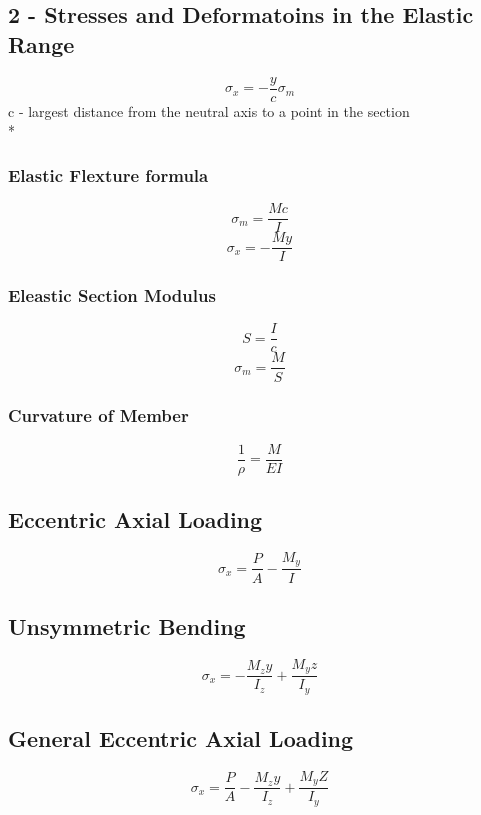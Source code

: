 \documentclass[10pt,landscape]{article}
\begin{document}
\begin{multicols}{3}
\subsection{2 - Stresses and Deformatoins in the Elastic Range}
\begin{equation}
    \sigma_x=-\frac{y}{c}\sigma_m
\end{equation}
c - largest distance from the neutral axis to a point in the section\\*
\subsubsection{Elastic Flexture formula}
\begin{equation}
    \sigma_m=\frac{Mc}{I}
\end{equation}
\begin{equation}
    \sigma_x=-\frac{My}{I}
\end{equation}
\subsubsection{Eleastic Section Modulus}
\begin{equation}
    S=\frac{I}{c}
\end{equation}
\begin{equation}
    \sigma_m=\frac{M}{S}
\end{equation}
\subsubsection{Curvature of Member}
\begin{equation}
    \frac{1}{\rho}=\frac{M}{EI}
\end{equation}
\subsection{Eccentric Axial Loading}
\begin{equation}
    \sigma_x=\frac{P}{A}-\frac{M_y}{I}    
\end{equation}
\subsection{Unsymmetric Bending}
\begin{equation}
    \sigma_x=-\frac{M_zy}{I_z}+\frac{M_yz}{I_y}
\end{equation}
\subsection{General Eccentric Axial Loading}
\begin{equation}
    \sigma_x=\frac{P}{A}-\frac{M_zy}{I_z}+\frac{M_yZ}{I_y}
\end{equation}

\end{multicols}
\end{document}
